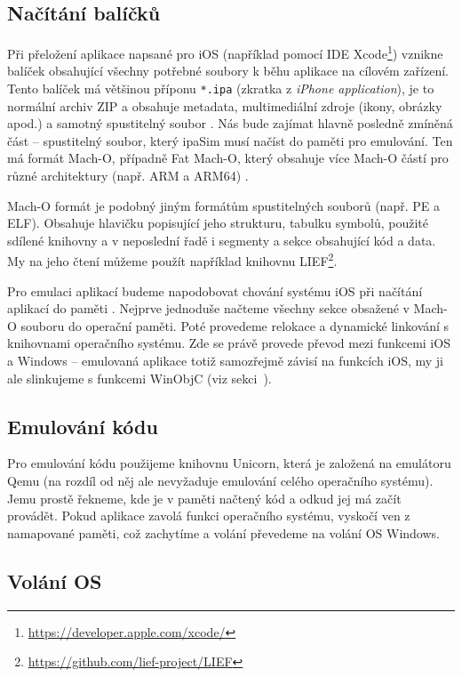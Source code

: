 \documentclass[12pt]{article}
\begin{document}
\subsection*{Načítání balíčků}

Při přeložení aplikace napsané pro iOS (například pomocí IDE Xcode\footnote{\url{https://developer.apple.com/xcode/}}) vznikne balíček obsahující všechny potřebné soubory k běhu aplikace na cílovém zařízení.
Tento balíček má většinou příponu \texttt{*.ipa} (zkratka z \textit{iPhone application}), je to normální archiv ZIP a obsahuje metadata, multimediální zdroje (ikony, obrázky apod.) a samotný spustitelný soubor \cite{ipa}.
Nás bude zajímat hlavně posledně zmíněná část -- spustitelný soubor, který ipaSim musí načíst do paměti pro emulování.
Ten má formát Mach-O, případně Fat Mach-O, který obsahuje více Mach-O částí pro různé architektury (např. ARM a ARM64) \cite{macho}.

Mach-O formát je podobný jiným formátům spustitelných souborů (např. PE a ELF).
Obsahuje hlavičku popisující jeho strukturu, tabulku symbolů, použité sdílené knihovny a v neposlední řadě i segmenty a sekce obsahující kód a data.
My na jeho čtení můžeme použít například knihovnu LIEF\footnote{\url{https://github.com/lief-project/LIEF}}.

Pro emulaci aplikací budeme napodobovat chování systému iOS při načítání aplikací do paměti \cite{execMacho}.
Nejprve jednoduše načteme všechny sekce obsažené v Mach-O souboru do operační paměti.
Poté provedeme relokace a dynamické linkování s knihovnami operačního systému.
Zde se právě provede převod mezi funkcemi iOS a Windows -- emulovaná aplikace totiž samozřejmě závisí na funkcích iOS, my ji ale slinkujeme s funkcemi WinObjC (viz sekci~).

\subsection*{Emulování kódu}

Pro emulování kódu použijeme knihovnu Unicorn, která je založená na emulátoru Qemu (na rozdíl od něj ale nevyžaduje emulování celého operačního systému).
Jemu prostě řekneme, kde je v paměti načtený kód a odkud jej má začít provádět.
Pokud aplikace zavolá funkci operačního systému, vyskočí ven z namapované paměti, což zachytíme a volání převedeme na volání OS Windows.

\subsection*{Volání OS}
\label{sec:winobjc}
\end{document}
